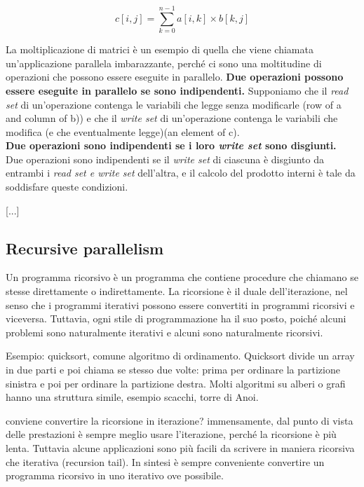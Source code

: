 \documentclass[10pt,a4paper]{book}
\begin{document}
\[c[i,j]=\sum_{k=0}^{n-1} a[i,k]\times b[k,j]\]

La moltiplicazione di matrici è un esempio di quella che viene chiamata un'applicazione parallela imbarazzante, perché ci sono una moltitudine di operazioni che possono essere eseguite in parallelo. \textbf{Due operazioni possono essere eseguite in parallelo se sono indipendenti.} Supponiamo che il \textit{read set} di un'operazione contenga le variabili che legge senza modificarle (row of a and column of b)) e che il \textit{write set} di un'operazione contenga le variabili che modifica (e che eventualmente legge)(an element of c).\\ \textbf{Due operazioni sono indipendenti se i loro \textit{write set} sono disgiunti.}\\
Due operazioni sono indipendenti se il \textit{write set} di ciascuna è disgiunto da entrambi i \textit{read set e write set} dell'altra, e il calcolo del prodotto interni è tale da soddisfare queste condizioni.

[...]

\subsection{Recursive parallelism}
Un programma ricorsivo è un programma che contiene procedure che chiamano se stesse direttamente o indirettamente. La ricorsione è il duale dell'iterazione, nel senso che i programmi iterativi possono essere convertiti in programmi ricorsivi e viceversa. Tuttavia, ogni stile di programmazione ha il suo posto, poiché alcuni problemi sono naturalmente iterativi e alcuni sono naturalmente ricorsivi.

Esempio: quicksort, comune algoritmo di ordinamento. Quicksort divide un array in due parti e poi chiama se stesso due volte: prima per ordinare la partizione sinistra e poi per ordinare la partizione destra. Molti algoritmi su alberi o grafi hanno una struttura simile, esempio scacchi, torre di Anoi.

conviene convertire la ricorsione in iterazione? immensamente, dal punto di vista delle prestazioni è sempre meglio usare l'iterazione, perché la ricorsione è più lenta.
Tuttavia alcune applicazioni sono più facili da scrivere in maniera ricorsiva che iterativa (recursion tail).
In sintesi è sempre conveniente convertire un programma ricorsivo in uno iterativo ove possibile.
\end{document}
